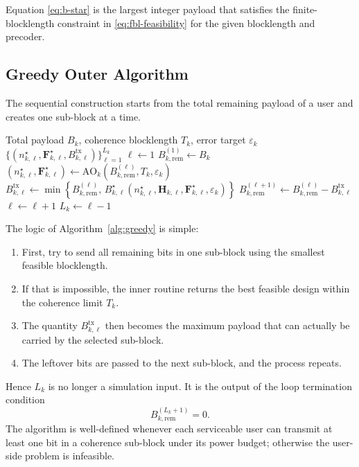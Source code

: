 \documentclass[11pt]{article}
\newcommand{\F}{\mathbf{F}}
\newcommand{\Hc}{\mathbf{H}}
\begin{document}
Equation \eqref{eq:b-star} is the largest integer payload that satisfies the finite-blocklength constraint in \eqref{eq:fbl-feasibility} for the given blocklength and precoder.

\subsection{Greedy Outer Algorithm}
The sequential construction starts from the total remaining payload of a user and creates one sub-block at a time.

\begin{algorithm}[ht]
\caption{Greedy Dynamic Sub-Block Construction for User $k$}
\label{alg:greedy}
\begin{algorithmic}[1]
\Require Total payload $B_k$, coherence blocklength $T_k$, error target $\varepsilon_k$
\Ensure $\{(n_{k,\ell}^\star,\F_{k,\ell}^\star,B_{k,\ell}^{\mathrm{tx}})\}_{\ell=1}^{L_k}$
\State $\ell \gets 1$
\State $B_{k,\mathrm{rem}}^{(1)} \gets B_k$
    \State $(n_{k,\ell}^\star,\F_{k,\ell}^\star) \gets \mathrm{AO}_k(B_{k,\mathrm{rem}}^{(\ell)},T_k,\varepsilon_k)$
    \State $B_{k,\ell}^{\mathrm{tx}} \gets \min\!\left\{B_{k,\mathrm{rem}}^{(\ell)},\,
    B_{k,\ell}^\star(n_{k,\ell}^\star,\Hc_{k,\ell},\F_{k,\ell}^\star,\varepsilon_k)\right\}$
    \State $B_{k,\mathrm{rem}}^{(\ell+1)} \gets B_{k,\mathrm{rem}}^{(\ell)} - B_{k,\ell}^{\mathrm{tx}}$
    \State $\ell \gets \ell + 1$
\EndWhile
\State $L_k \gets \ell - 1$
\end{algorithmic}
\end{algorithm}

The logic of Algorithm~\ref{alg:greedy} is simple:
\begin{enumerate}
    \item First, try to send all remaining bits in one sub-block using the smallest feasible blocklength.
    \item If that is impossible, the inner routine returns the best feasible design within the coherence limit $T_k$.
    \item The quantity $B_{k,\ell}^{\mathrm{tx}}$ then becomes the maximum payload that can actually be carried by the selected sub-block.
    \item The leftover bits are passed to the next sub-block, and the process repeats.
\end{enumerate}

Hence $L_k$ is no longer a simulation input. It is the output of the loop termination condition
\[
B_{k,\mathrm{rem}}^{(L_k+1)} = 0.
\]
The algorithm is well-defined whenever each serviceable user can transmit at least one bit in a coherence sub-block under its power budget; otherwise the user-side problem is infeasible.
\end{document}
